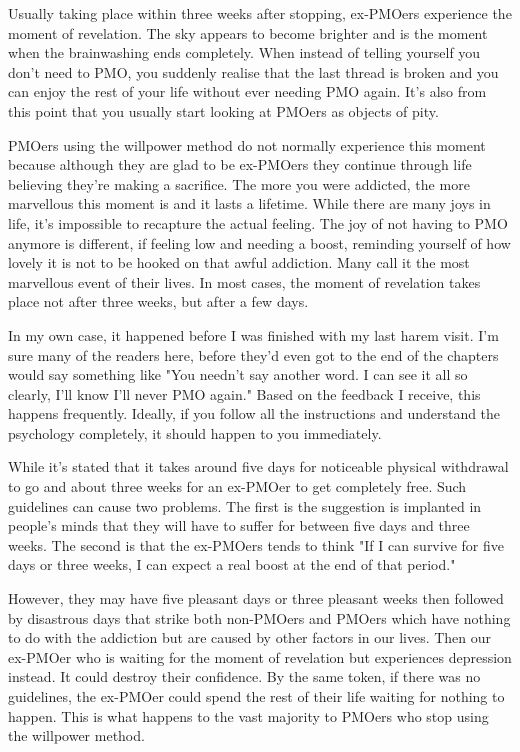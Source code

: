 \documentclass[easypeasy.tex]{subfiles}
\begin{document}
Usually taking place within three weeks after stopping, ex-PMOers experience the moment of revelation. The sky appears to become brighter and is the moment when the brainwashing ends completely. When instead of telling yourself you don't need to PMO, you suddenly realise that the last thread is broken and you can enjoy the rest of your life without ever needing PMO again. It's also from this point that you usually start looking at PMOers as objects of pity.

PMOers using the willpower method do not normally experience this moment because although they are glad to be ex-PMOers they continue through life believing they're making a sacrifice. The more you were addicted, the more marvellous this moment is and it lasts a lifetime. While there are many joys in life, it's impossible to recapture the actual feeling. The joy of not having to PMO anymore is different, if feeling low and needing a boost, reminding yourself of how lovely it is not to be hooked on that awful addiction. Many call it the most marvellous event of their lives. In most cases, the moment of revelation takes place not after three weeks, but after a few days. 

In my own case, it happened before I was finished with my last harem visit. I'm sure many of the readers here, before they'd even got to the end of the chapters would say something like "You needn't say another word. I can see it all so clearly, I'll know I'll never PMO again." Based on the feedback I receive, this happens frequently. Ideally, if you follow all the instructions and understand the psychology completely, it should happen to you immediately.

While it's stated that it takes around five days for noticeable physical withdrawal to go and about three weeks for an ex-PMOer to get completely free. Such guidelines can cause two problems. The first is the suggestion is implanted in people's minds that they will have to suffer for between five days and three weeks. The second is that the ex-PMOers tends to think "If I can survive for five days or three weeks, I can expect a real boost at the end of that period."

However, they may have five pleasant days or three pleasant weeks then followed by disastrous days that strike both non-PMOers and PMOers which have nothing to do with the addiction but are caused by other factors in our lives. Then our ex-PMOer who is waiting for the moment of revelation but experiences depression instead. It could destroy their confidence. By the same token, if there was no guidelines, the ex-PMOer could spend the rest of their life waiting for nothing to happen. This is what happens to the vast majority to PMOers who stop using the willpower method.
\end{document}
